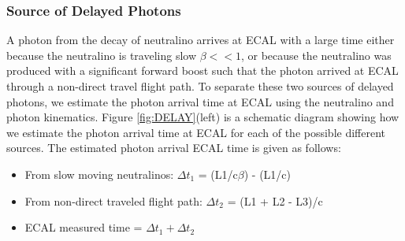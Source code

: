 \subsubsection*{Source of Delayed Photons}
A photon from the decay of neutralino arrives at ECAL with a large time either because the neutralino is traveling slow \ie $\beta << 1$, or because the neutralino was produced with a significant forward boost such that the photon arrived at ECAL through a non-direct travel flight path. To separate these two sources of delayed photons, we estimate the photon arrival time at ECAL using the neutralino and photon  kinematics. Figure \ref{fig:DELAY}(left) is a schematic diagram showing how we estimate the photon arrival time at ECAL for each of the possible different sources. The estimated photon arrival ECAL time is given as follows:
\begin{itemize}
  \item From slow moving neutralinos: $\Delta t_1$ = (L1/c$\beta$) - (L1/c)
  \item From non-direct traveled flight path: $\Delta t_2$ = (L1 + L2 - L3)/c
  \item ECAL measured time = $\Delta t_{1} + \Delta t_{2}$
\end{itemize}
